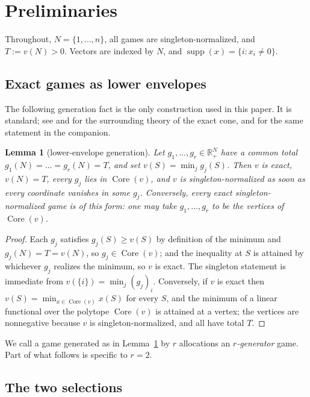 \documentclass[11pt]{article}
\newtheorem{lemma}[theorem]{Lemma}
\newcommand{\core}{\operatorname{Core}}
\newcommand{\supp}{\operatorname{supp}}
\begin{document}
\section{Preliminaries}\label{sec:prelim}

Throughout, $N=\{1,\dots,n\}$, all games are singleton-normalized, and
$T:=v(N)>0$.  Vectors are indexed by $N$, and $\supp(x)=\{i:x_i\ne0\}$.

\subsection{Exact games as lower envelopes}

The following generation fact is the only construction used in this paper.
It is standard; see \citet{CsokaHeringsKoczy2011} and
\citet{StudenyKratochvil2022} for the surrounding theory of the exact cone,
and \citet{Flanagan2026} for the same statement in the companion.

\begin{lemma}[lower-envelope generation]\label{lem:envelope}
Let $g_1,\dots,g_r\in\mathbb R_+^N$ have a common total
$g_1(N)=\dots=g_r(N)=T$, and set $v(S)=\min_{j}g_j(S)$.  Then $v$ is exact,
$v(N)=T$, every $g_j$ lies in $\core(v)$, and $v$ is singleton-normalized as
soon as every coordinate vanishes in some $g_j$.  Conversely, every exact
singleton-normalized game is of this form: one may take $g_1,\dots,g_r$ to be
the vertices of $\core(v)$.
\end{lemma}

\begin{proof}
Each $g_j$ satisfies $g_j(S)\ge v(S)$ by definition of the minimum and
$g_j(N)=T=v(N)$, so $g_j\in\core(v)$; and the inequality at $S$ is attained
by whichever $g_j$ realizes the minimum, so $v$ is exact.  The singleton
statement is immediate from $v(\{i\})=\min_j (g_j)_i$.  Conversely, if $v$ is
exact then $v(S)=\min_{x\in\core(v)}x(S)$ for every $S$, and the minimum of a
linear functional over the polytope $\core(v)$ is attained at a vertex; the
vertices are nonnegative because $v$ is singleton-normalized, and all have
total $T$.
\end{proof}

We call a game generated as in Lemma~\ref{lem:envelope} by $r$ allocations an
\emph{$r$-generator} game.  Part of what follows is specific to $r=2$.

\subsection{The two selections}
\end{document}
